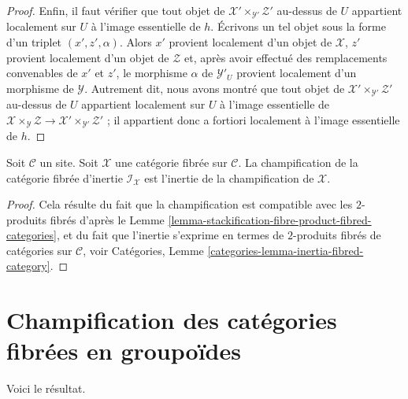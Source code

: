 \begin{proof}
\medskip\noindent
Enfin, il faut vérifier que tout objet de
$\mathcal{X}' \times_{\mathcal{Y}'} \mathcal{Z}'$
au-dessus de $U$ appartient localement sur $U$ à l'image essentielle de $h$.
Écrivons un tel objet sous la forme d'un triplet $(x', z', \alpha)$.
Alors $x'$ provient localement d'un objet de $\mathcal{X}$,
$z'$ provient localement d'un objet de $\mathcal{Z}$ et,
après avoir effectué des remplacements convenables de $x'$ et $z'$, le morphisme
$\alpha$ de $\mathcal{Y}'_U$ provient localement d'un morphisme de
$\mathcal{Y}$. Autrement dit, nous avons montré que tout objet de
$\mathcal{X}' \times_{\mathcal{Y}'} \mathcal{Z}'$
au-dessus de $U$ appartient localement sur $U$ à l'image essentielle de
$\mathcal{X} \times_\mathcal{Y} \mathcal{Z} \to
\mathcal{X}' \times_{\mathcal{Y}'} \mathcal{Z}'$ ; il appartient donc
a fortiori localement à l'image essentielle de $h$.
\end{proof}

\begin{lemma}
\label{lemma-stackification-inertia}
Soit $\mathcal{C}$ un site.
Soit $\mathcal{X}$ une catégorie fibrée sur $\mathcal{C}$.
La champification de la catégorie fibrée d'inertie $\mathcal{I}_\mathcal{X}$
est l'inertie de la champification de $\mathcal{X}$.
\end{lemma}

\begin{proof}
Cela résulte du fait que la champification est compatible
avec les $2$-produits fibrés d'après le
Lemme \ref{lemma-stackification-fibre-product-fibred-categories},
et du fait que l'inertie s'exprime en termes de
$2$-produits fibrés de catégories sur $\mathcal{C}$, voir
Catégories, Lemme \ref{categories-lemma-inertia-fibred-category}.
\end{proof}






\section{Champification des catégories fibrées en groupoïdes}
\label{section-stackify-groupoids}

\noindent
Voici le résultat.

